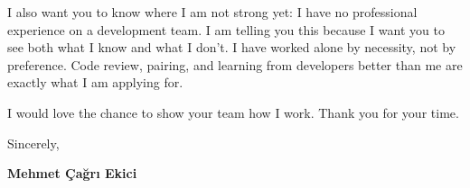 \documentclass[11pt,a4paper]{article}
\begin{document}
I also want you to know where I am not strong yet: I have no professional experience on a development team. I am telling you this because I want you to see both what I know and what I don't. I have worked alone by necessity, not by preference. Code review, pairing, and learning from developers better than me are exactly what I am applying for.

I would love the chance to show your team how I work. Thank you for your time.

Sincerely,

\textbf{Mehmet Çağrı Ekici}
\end{document}
